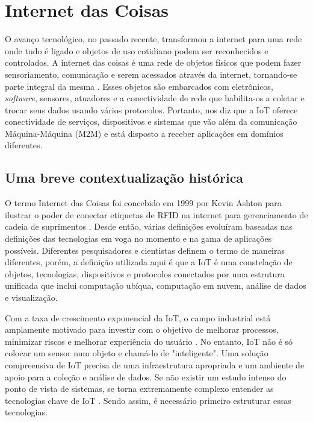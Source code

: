 \documentclass[tcc,capa]{texufpel}
\begin{document}
\section{Internet das Coisas}

O avanço tecnológico, no passado recente, transformou a internet para uma rede onde tudo é ligado e objetos de uso cotidiano podem ser reconhecidos e controlados. A internet das coisas é uma rede de objetos físicos que podem fazer sensoriamento, comunicação e serem acessados através da internet, tornando-se parte integral da mesma \cite{Sharma2019}. Esses objetos são embarcados com eletrônicos, \textit{software}, sensores, atuadores e a conectividade de rede que habilita-os a coletar e trocar seus dados usando vários protocolos. Portanto, \cite{Sharma2019} nos diz que a IoT oferece conectividade de serviços, dispositivos e sistemas que vão além da comunicação Máquina-Máquina (M2M) e está disposto a receber aplicações em domínios diferentes.

\subsection{Uma breve contextualização histórica}

O termo Internet das Coisas foi concebido em 1999 por Kevin Ashton para ilustrar o poder de conectar etiquetas de RFID na internet para gerenciamento de cadeia de suprimentos \cite{ashton}. Desde então, várias definições evoluíram baseadas nas definições das tecnologias em voga no momento e na gama de aplicações possíveis. Diferentes pesquisadores e cientistas definem o termo de maneiras diferentes, porém, a definição utilizada aqui é que a IoT é uma constelação de objetos, tecnologias, dispositivos e protocolos conectados por uma estrutura unificada que inclui computação ubíqua, computação em nuvem, análise de dados e visualização.

Com a taxa de crescimento exponencial da IoT, o campo industrial está amplamente motivado para investir com o objetivo de melhorar processos, minimizar riscos e melhorar experiência do usuário \cite{Sharma2019}. No entanto, IoT não é só colocar um sensor num objeto e chamá-lo de "inteligente". Uma solução compreensiva de IoT precisa de uma infraestrutura apropriada e um ambiente de apoio para a coleção e análise de dados. Se não existir um estudo intenso do ponto de vista de sistemas, se torna extremamente complexo entender as tecnologias chave de IoT \cite{xu}. Sendo assim, é necessário primeiro estruturar essas tecnologias.
\end{document}
